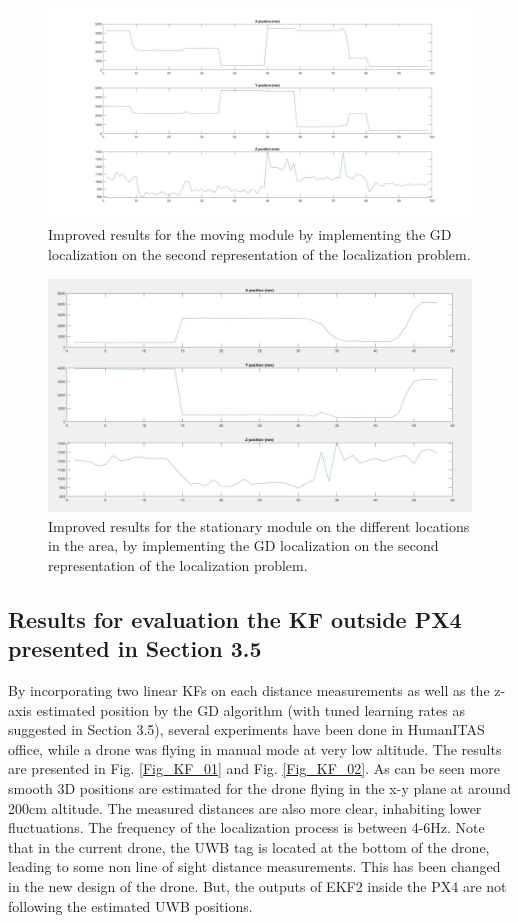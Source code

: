 \documentclass{article}
\begin{document}
\begin{figure}[thpb]
\centering
\includegraphics[scale=0.16]{Pics/Improved_Results_03.JPG}
\caption{Improved results for the moving module by implementing the GD localization on the second representation of the localization problem.}
\label{Fig_11}
\end{figure}


\begin{figure}[thpb]
\centering
\includegraphics[scale=0.4]{Pics/Improved_Results_04_Moving_Module.JPG}
\caption{Improved results for the stationary module on the different locations in the area, by implementing the GD localization on the second representation of the localization problem.}
\label{Fig_12}
\end{figure}

\newpage
\subsection{Results for evaluation the KF outside PX4 presented in Section 3.5}
By incorporating two linear KFs on each distance measurements as well as the z-axis estimated position by the GD algorithm (with tuned learning rates as suggested in Section 3.5), several experiments have been done in HumanITAS office, while a drone was flying in manual mode at very low altitude.
The results are presented in Fig. \ref{Fig_KF_01} and Fig. \ref{Fig_KF_02}. As can be seen more smooth 3D positions are estimated for the drone flying in the x-y plane at around 200cm altitude. The measured distances are also more clear, inhabiting lower fluctuations. The frequency of the localization process is between 4-6Hz. 
Note that in the current drone, the UWB tag is located at the bottom of the drone, leading to some non line of sight distance measurements. This has been changed in the new design of the drone.
But, the outputs of EKF2 inside the PX4 are not following the estimated UWB positions. 
\end{document}
